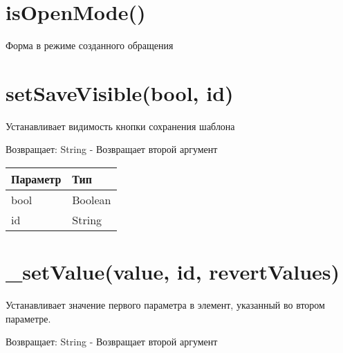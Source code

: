 \hypertarget{isopenmode-boolean}{%
\section{isOpenMode()}\label{isopenmode-boolean}}

Форма в режиме созданного обращения


\hypertarget{setsavevisiblebool-id-string}{%
\section{setSaveVisible(bool, id)}\label{setsavevisiblebool-id-string}}

Устанавливает видимость кнопки сохранения шаблона

Возвращает: String - Возвращает второй аргумент

\begin{longtable}[]{@{}ll@{}}
\toprule
Параметр & Тип\tabularnewline
\midrule
\endhead
bool & Boolean\tabularnewline
id & String\tabularnewline
\bottomrule
\end{longtable}

\hypertarget{setvaluevalue-id-revertvalues-string}{%
\section{\_setValue(value, id, revertValues)}\label{setvaluevalue-id-revertvalues-string}}

Устанавливает значение первого параметра в элемент, указанный во втором
параметре.

Возвращает: String - Возвращает второй аргумент

